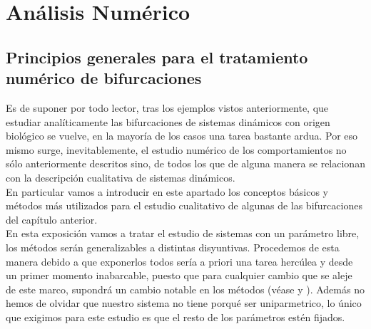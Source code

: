 \chapter{Análisis Numérico}

\label{ch:numerico}

\section{Principios generales para el tratamiento numérico de bifurcaciones}
Es de suponer por todo lector, tras los ejemplos vistos anteriormente, que estudiar analíticamente las bifurcaciones de sistemas dinámicos con origen biológico se vuelve, en la mayoría de los casos una tarea bastante ardua. Por eso mismo surge, inevitablemente, el estudio numérico de los comportamientos no sólo anteriormente descritos sino, de todos los que de alguna manera se relacionan con la descripción cualitativa de sistemas dinámicos.\\
En particular vamos a introducir en este apartado los conceptos básicos y métodos más utilizados para el estudio cualitativo de algunas de las bifurcaciones del capítulo anterior.\\
En esta exposición vamos a tratar el estudio de sistemas con un parámetro libre, los métodos serán generalizables a distintas disyuntivas. Procedemos de esta manera debido a que exponerlos todos sería a priori una tarea hercúlea y desde un primer momento inabarcable, puesto que para cualquier cambio que se aleje de este marco, supondrá un cambio notable en los métodos (véase \cite{Lectures} y \cite{prac}). Además no hemos de olvidar que nuestro sistema no tiene porqué ser uniparmetrico, lo único que exigimos para este estudio es que el resto de los parámetros estén fijados.

